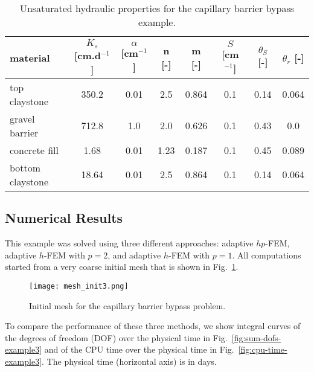 \documentclass[final,3p,times,twocolumn]{elsarticle}
\begin{document}
\begin{table*}[!htb]
\begin{center}
\begin{tabular}{|l||c|c|c|c|c|c|c|}
\hline
material & $K_s$ [cm.d${}^{-1}$] & $\alpha$ [cm${}^{-1}$] & n [-] & m [-] &  $S$ [cm${}^{-1}$] & $\theta_S$ [-] & $\theta_r$ [-]\\
\hline
\hline
top claystone & 350.2 & 0.01 & 2.5 & 0.864 & 0.1 & 0.14 & 0.064 \\ \hline
gravel barrier & 712.8 & 1.0 & 2.0 & 0.626 & 0.1 & 0.43 & 0.0 \\ \hline
concrete fill & 1.68 & 0.01 & 1.23 & 0.187 & 0.1 &  0.45 & 0.089 \\ \hline
bottom claystone & 18.64 & 0.01 & 2.5 & 0.864 & 0.1 & 0.14 & 0.064 \\ \hline
\end{tabular}
\end{center}
\vspace{-4mm}
\caption{Unsaturated hydraulic properties for the capillary barrier bypass example.}
\label{tab:mat-example3}
\end{table*}



\subsection{Numerical Results}

This example was solved using three different approaches: 
adaptive $hp$-FEM, adaptive $h$-FEM with $p=2$, and adaptive $h$-FEM 
with $p=1$. All computations started from a very coarse initial mesh 
that is shown in Fig.~\ref{fig:example3-initmesh}.

\begin{figure}[!htb]
\begin{center}
\texttt{[image: mesh\_init3.png]}
\end{center}
\vspace{-4mm}
\caption{Initial mesh for the capillary barrier bypass problem.}
\label{fig:example3-initmesh}
\end{figure}

To compare the performance of these three methods, we show integral curves 
of the degrees of freedom (DOF) over the physical time in Fig.~\ref{fig:sum-dofs-example3} and 
of the CPU time over the physical time in Fig.~\ref{fig:cpu-time-example3}. The physical time
(horizontal axis) is in days.
\end{document}
